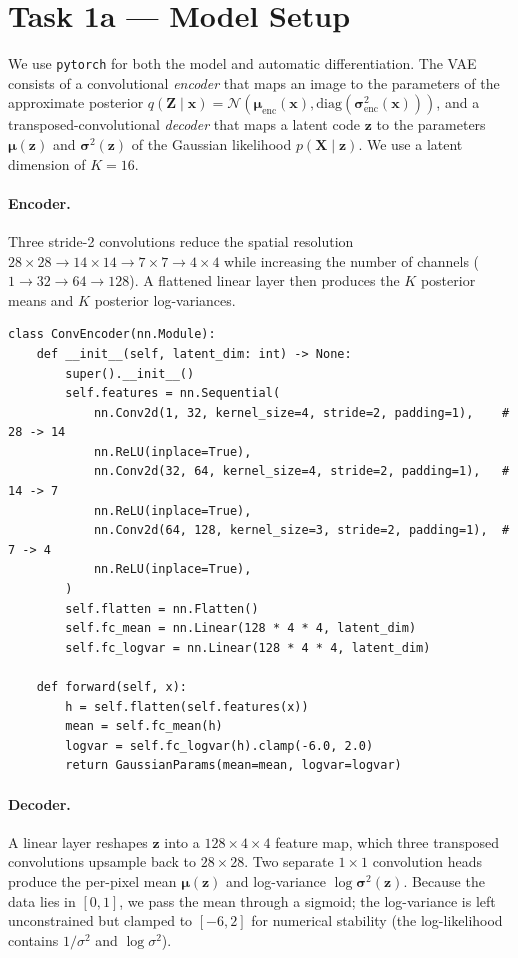 \documentclass{article}
\newcommand{\bx}{\mathbf{x}}
\newcommand{\bX}{\mathbf{X}}
\newcommand{\bz}{\mathbf{z}}
\newcommand{\bZ}{\mathbf{Z}}
\newcommand{\bmu}{\bm{\mu}}
\newcommand{\bsigma}{\bm{\sigma}}
\begin{document}
\section*{Task 1a --- Model Setup}

We use \texttt{pytorch} for both the model and automatic differentiation. The
VAE consists of a convolutional \emph{encoder} that maps an image to the
parameters of the approximate posterior
$q(\bZ \mid \bx) = \mathcal{N}(\bmu_{\text{enc}}(\bx), \mathrm{diag}(\bsigma_{\text{enc}}^2(\bx)))$,
and a transposed-convolutional \emph{decoder} that maps a latent code $\bz$ to
the parameters $\bmu(\bz)$ and $\bsigma^2(\bz)$ of the Gaussian likelihood
$p(\bX \mid \bz)$. We use a latent dimension of $K=16$.

\paragraph{Encoder.} Three stride-2 convolutions reduce the spatial resolution
$28\!\times\!28 \to 14\!\times\!14 \to 7\!\times\!7 \to 4\!\times\!4$ while
increasing the number of channels ($1 \to 32 \to 64 \to 128$). A flattened
linear layer then produces the $K$ posterior means and $K$ posterior
log-variances.

\begin{lstlisting}[caption={Convolutional encoder (\texttt{vae/model.py}).}]
class ConvEncoder(nn.Module):
    def __init__(self, latent_dim: int) -> None:
        super().__init__()
        self.features = nn.Sequential(
            nn.Conv2d(1, 32, kernel_size=4, stride=2, padding=1),    # 28 -> 14
            nn.ReLU(inplace=True),
            nn.Conv2d(32, 64, kernel_size=4, stride=2, padding=1),   # 14 -> 7
            nn.ReLU(inplace=True),
            nn.Conv2d(64, 128, kernel_size=3, stride=2, padding=1),  # 7 -> 4
            nn.ReLU(inplace=True),
        )
        self.flatten = nn.Flatten()
        self.fc_mean = nn.Linear(128 * 4 * 4, latent_dim)
        self.fc_logvar = nn.Linear(128 * 4 * 4, latent_dim)

    def forward(self, x):
        h = self.flatten(self.features(x))
        mean = self.fc_mean(h)
        logvar = self.fc_logvar(h).clamp(-6.0, 2.0)
        return GaussianParams(mean=mean, logvar=logvar)
\end{lstlisting}

\paragraph{Decoder.} A linear layer reshapes $\bz$ into a $128\!\times\!4\!\times\!4$
feature map, which three transposed convolutions upsample back to
$28\!\times\!28$. Two separate $1\!\times\!1$ convolution heads produce the
per-pixel mean $\bmu(\bz)$ and log-variance $\log\bsigma^2(\bz)$. Because the
data lies in $[0,1]$, we pass the mean through a sigmoid; the log-variance is
left unconstrained but clamped to $[-6, 2]$ for numerical stability (the
log-likelihood contains $1/\sigma^2$ and $\log\sigma^2$).
\end{document}
